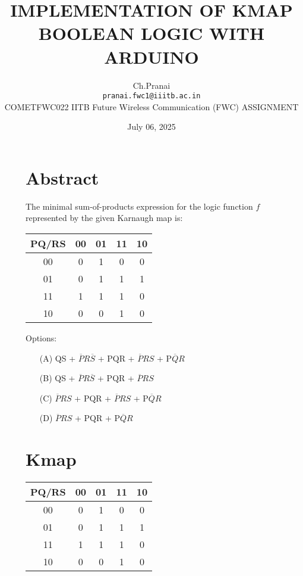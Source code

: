 \documentclass[12pt,a4paper]{article}
\title{\textbf{IMPLEMENTATION OF KMAP BOOLEAN LOGIC WITH ARDUINO}}
\author{Ch.Pranai \\ \texttt{pranai.fwc1@iiitb.ac.in} \\
 \hspace{-0.3cm}COMETFWC022\hspace{0.5cm} IITB Future Wireless Communication (FWC)\hspace{0.4cm} ASSIGNMENT}
\date{July 06, 2025}
\begin{document}
\maketitle

\begin{figure}[H]
  \centering
  \begin{minipage}[t]{0.48\textwidth}
    \section*{Abstract}
    \small
    The minimal sum-of-products expression for the logic function $f$ represented by the given Karnaugh map is:

    \vspace{0.3cm}

    \renewcommand{\arraystretch}{1.3}
    \begin{tabular}{c|c|c|c|c}
      PQ/RS & 00 & 01 & 11 & 10 \\ \hline
      00 & 0 & 1 & 0 & 0 \\ \hline
      01 & 0 & 1 & 1 & 1 \\ \hline
      11 & 1 & 1 & 1 & 0 \\ \hline
      10 & 0 & 0 & 1 & 0 \\
    \end{tabular}

    \vspace{0.3cm}

    Options:
    \begin{enumerate}
      \item[(A)] QS + $\overline{P}R\overline{S}$ + PQR + $\overline{P}RS$ + P$\overline{Q}R$
      \item[(B)] QS + $\overline{P}R\overline{S}$ + PQR + $\overline{P}RS$
      \item[(C)] $\overline{P}RS$ + PQR + $\overline{P}RS$ + P$\overline{Q}R$
      \item[(D)] $\overline{P}RS$ + PQR + P$\overline{Q}R$
    \end{enumerate}

    \vspace{0.5cm}

    \section*{Kmap}

   \renewcommand{\arraystretch}{1.3}
    \begin{tabular}{c|c|c|c|c}
      PQ/RS & 00 & 01 & 11 & 10 \\ \hline
      00 & 0 & 1 & 0 & 0 \\ \hline
      01 & 0 & 1 & 1 & 1 \\ \hline
      11 & 1 & 1 & 1 & 0 \\ \hline
      10 & 0 & 0 & 1 & 0 \\
    \end{tabular}


\end{minipage}
\end{figure}
\end{document}

